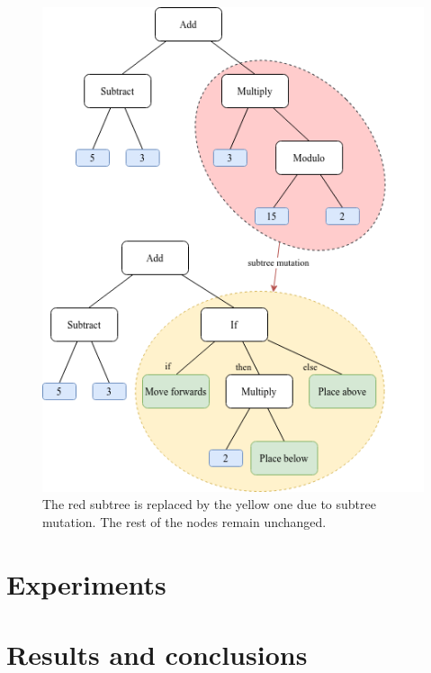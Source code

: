 \documentclass{report}
\begin{document}
\begin{figure}[ht]
    \centering
    \includegraphics[scale=0.75]{subtree_mutation}
    \caption{The red subtree is replaced by the yellow one due to subtree mutation. The rest of the nodes remain unchanged.}
\end{figure}

\chapter{Experiments}

\chapter{Results and conclusions}



\end{document}
